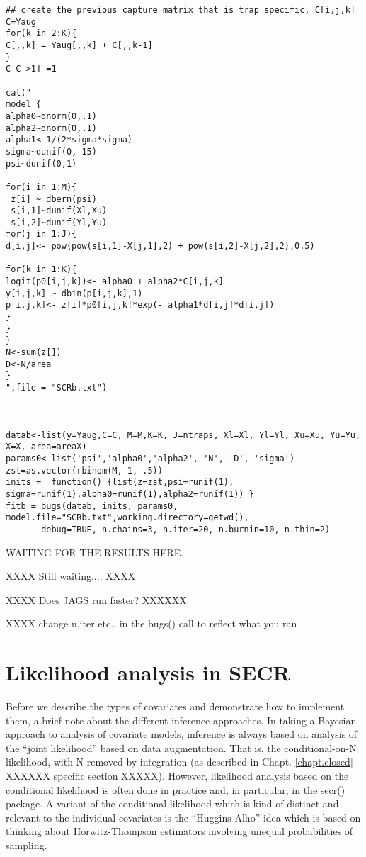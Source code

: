 {\small
\begin{verbatim}
## create the previous capture matrix that is trap specific, C[i,j,k]
C=Yaug
for(k in 2:K){
C[,,k] = Yaug[,,k] + C[,,k-1]
}
C[C >1] =1

cat("
model {
alpha0~dnorm(0,.1)
alpha2~dnorm(0,.1)
alpha1<-1/(2*sigma*sigma)
sigma~dunif(0, 15)
psi~dunif(0,1)

for(i in 1:M){
 z[i] ~ dbern(psi)
 s[i,1]~dunif(Xl,Xu)
 s[i,2]~dunif(Yl,Yu)
for(j in 1:J){
d[i,j]<- pow(pow(s[i,1]-X[j,1],2) + pow(s[i,2]-X[j,2],2),0.5)

for(k in 1:K){
logit(p0[i,j,k])<- alpha0 + alpha2*C[i,j,k]
y[i,j,k] ~ dbin(p[i,j,k],1)
p[i,j,k]<- z[i]*p0[i,j,k]*exp(- alpha1*d[i,j]*d[i,j])
}
}
}
N<-sum(z[])
D<-N/area
}
",file = "SCRb.txt")



datab<-list(y=Yaug,C=C, M=M,K=K, J=ntraps, Xl=Xl, Yl=Yl, Xu=Xu, Yu=Yu, X=X, area=areaX)
params0<-list('psi','alpha0','alpha2', 'N', 'D', 'sigma')
zst=as.vector(rbinom(M, 1, .5))
inits =  function() {list(z=zst,psi=runif(1), sigma=runif(1),alpha0=runif(1),alpha2=runif(1)) }
fitb = bugs(datab, inits, params0, model.file="SCRb.txt",working.directory=getwd(),    
       debug=TRUE, n.chains=3, n.iter=20, n.burnin=10, n.thin=2)

\end{verbatim}
}


WAITING FOR THE RESULTS HERE.  

XXXX  Still waiting.... XXXX

XXXX Does JAGS run faster? XXXXXX

XXXX change n.iter etc.. in the bugs() call to reflect what you ran




\section{Likelihood analysis in SECR}

Before we describe the types of covariates and demonstrate how to
implement them, a brief note about the different inference approaches.
In taking a Bayesian approach to analysis of covariate models,
inference is always based on analysis of the ``joint likelihood''
based on data augmentation. That is, the conditional-on-N likelihood,
with N removed by integration (as described in
Chapt. \ref{chapt.closed} XXXXXX specific section XXXXX).
However, likelihood analysis
based on the conditional likelihood is often done in practice and, in
particular, in the secr() package.  A variant of the conditional
likelihood which is kind of distinct and relevant to the individual
covariates is the ``Huggins-Alho'' idea which is based on thinking
about Horwitz-Thompson estimators involving unequal probabilities of
sampling. 



